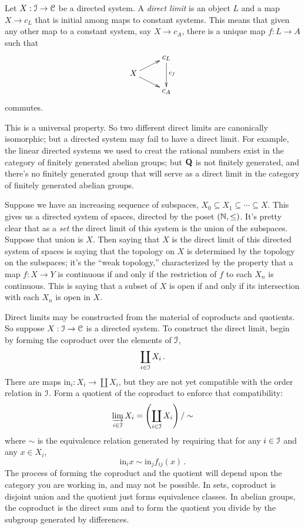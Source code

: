 \begin{definition}
Let $X:\mathcal I\to\mathcal C$ be a directed system.
A {\em direct limit} is an object $L$ and a map $X\to c_L$ that is initial among maps to constant systems. This means that given any other map to a constant system, say $X\to c_A$, there is a unique map $f:L\to A$ such that 
\[
\xymatrix@R=8pt{
& c_L \ar[dd]^{c_f} \\
X \ar[ur] \ar[dr] \\
& c_A
}\]
commutes.
\end{definition}
This is a universal property. So two different direct limits are canonically isomorphic; but a directed system may fail to have a direct limit. For example, the linear directed systems we used to creat the rational numbers exist in the category of finitely generated abelian groups; but $\mathbf Q$ is not finitely generated, and there's no finitely generated group that will serve as a direct limit in the category of finitely generated abelian groups. 
\begin{example}
Suppose we have an increasing sequence of subspaces, 
$X_0\subseteq X_1\subseteq\cdots\subseteq X$. This gives us a directed system
of spaces, directed by the poset $(\mathbb N,\leq)$. It's pretty clear that as a 
{\em set} the direct limit of this system is the union of the subspaces. 
Suppose that union is $X$. Then saying that $X$ is the direct limit of this 
directed system of spaces is saying that the topology on $X$ is determined
by the topology on the subspaces; it's the ``weak topology,'' characterized
by the property that a map $f:X\to Y$ is continuous if and only if the 
restriction of $f$ to each $X_n$ is continuous. This is saying that a subset 
of $X$ is open if and only if its intersection with each $X_n$ is open in $X$.
\end{example}
Direct limits may be constructed from the material of coproducts and quotients. So suppose $X:\mathcal I\to\mathcal C$ is a directed system. To construct the direct limit, begin by forming the coproduct over the elements of $\mathcal I$,
\[
\coprod_{i\in\mathcal I}X_i\,.
\]
There are maps $\mathrm{in}_i:X_i\to\coprod X_i$, but they are not yet compatible with the order relation in $\mathcal I$. Form a quotient of the coproduct to enforce that compatibility: 
\[
\varinjlim_{i\in\mathcal I}X_i=\left(\coprod_{i\in\mathcal I}X_i\right)/\sim
\]
where $\sim$ is the equivalence relation generated by requiring that 
for any $i\in\mathcal I$ and any $x\in X_i$, 
\[
\mathrm{in}_ix\sim\mathrm{in}_j f_{ij}(x)\,.
\]
The process of forming the coproduct and the quotient will depend upon the 
category you are working in, and may not be possible. 
In sets, coproduct is disjoint union and the
quotient just forms equivalence classes. In abelian groups, the coproduct
is the direct sum and to form the quotient you divide by the subgroup 
generated by differences. 

